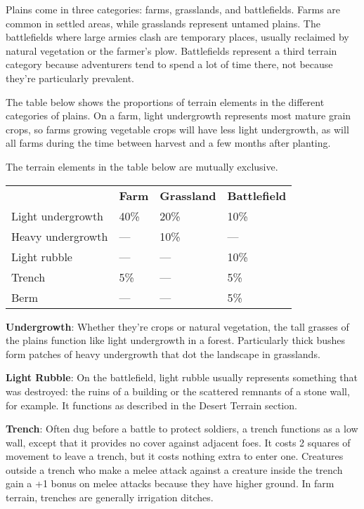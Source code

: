 				
Plains come in three categories: farms, grasslands, and battlefields. Farms are common in settled areas, while grasslands represent untamed plains. The battlefields where large armies clash are temporary places, usually reclaimed by natural vegetation or the farmer's plow. Battlefields represent a third terrain category because adventurers tend to spend a lot of time there, not because they're particularly prevalent.
				
The table below shows the proportions of terrain elements in the different categories of plains. On a farm, light undergrowth represents most mature grain crops, so farms growing vegetable crops will have less light undergrowth, as will all farms during the time between harvest and a few months after planting.
				
The terrain elements in the table below are mutually exclusive.
				

\begin{tabular}{llll}
 & \textbf{Farm} & \textbf{Grassland} & \textbf{Battlefield}\\
Light undergrowth & 40\% & 20\% & 10\%\\
Heavy undergrowth & --- & 10\% & ---\\
Light rubble & --- &--- & 10\%\\
Trench & 5\% & --- & 5\%\\
Berm & --- & --- & 5\%\\
\end{tabular}
				
\textbf{Undergrowth}: Whether they're crops or natural vegetation, the tall grasses of the plains function like light undergrowth in a forest. Particularly thick bushes form patches of heavy undergrowth that dot the landscape in grasslands.
				
\textbf{Light Rubble}: On the battlefield, light rubble usually represents something that was destroyed: the ruins of a building or the scattered remnants of a stone wall, for example. It functions as described in the Desert Terrain section.
				
\textbf{Trench}: Often dug before a battle to protect soldiers, a trench functions as a low wall, except that it provides no cover against adjacent foes. It costs 2 squares of movement to leave a trench, but it costs nothing extra to enter one. Creatures outside a trench who make a melee attack against a creature inside the trench gain a +1 bonus on melee attacks because they have higher ground. In farm terrain, trenches are generally irrigation ditches.
				

